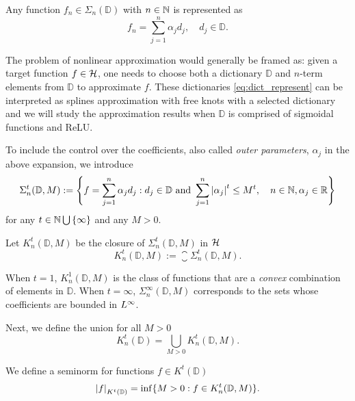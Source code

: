 Any function $f_n \in \Sigma_n(\mathbb{D})$ with $n \in \mathbb{N}$ is represented as
\begin{equation}
    \label{eq:gm}
    f_n = \sum_{j=1}^n \alpha_j d_j, \quad d_j \in \mathbb{D}.
\end{equation}

The problem of nonlinear approximation would generally be framed as: given a
target function $f \in \mathcal{H}$, one needs to choose both a dictionary
$\mathbb{D}$ and $n$-term elements from $\mathbb{D}$ to approximate $f$. These
dictionaries \eqref{eq:dict_represent} can be interpreted as splines
approximation with free knots with a selected dictionary and we will study the
approximation results when $\mathbb{D}$ is comprised of sigmoidal functions and
ReLU.

To include the control over the coefficients, also called \textit{outer
parameters}, $\alpha_j$ in the above expansion, we introduce
\begin{equation}
    \label{eq:dict_sigma}
    \Sigma^{t}_n(\mathbb{D}, M) := \Bigg\{
        f = \sum_{j=1}^n \alpha_j d_j: 
        d_j \in \mathbb{D} \textnormal{ and } 
        \sum_{j=1}^n \left| \alpha_j \right|^t \leq M^t, \quad 
        n \in \mathbb{N}, \alpha_j \in \mathbb{R}
    \Bigg\}
\end{equation}
for any $t \in \mathbb{N} \bigcup\, \{\infty\}$ and any $M > 0$. 

Let $K^t_n(\mathbb{D}, M)$ be the closure of $\Sigma^t_n(\mathbb{D}, M)$ in
$\mathcal{H}$
\begin{equation}
    K^t_n(\mathbb{D}, M) := \closure{\Sigma^t_n(\mathbb{D}, M)}.
\end{equation}

When $t = 1$, $K^1_n(\mathbb{D}, M)$ is the class of functions that are a
\textit{convex} combination of elements in $\mathbb{D}$. When $t = \infty$,
$\Sigma^{\infty}_n(\mathbb{D}, M)$ corresponds to the sets whose coefficients
are bounded in $L^{\infty}$. 

Next, we define the union for all $M > 0$
\begin{equation}
    K^t_n(\mathbb{D}) = \bigcup_{M > 0} K^t_n(\mathbb{D}, M).
\end{equation}

We define a seminorm for functions $f \in K^t(\mathbb{D})$
\begin{equation}
    \label{eq:general_seminorm}
    \left| f \right|_{K^t(\mathbb{D})} = \inf \{
        M >0: f \in K^t_n(\mathbb{D}, M)
    \}.
\end{equation}

